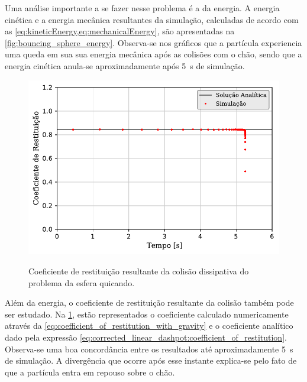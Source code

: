 Uma análise importante a se fazer nesse problema é a da energia. A energia cinética e a energia mecânica resultantes da simulação, calculadas de acordo com as \cref{eq:kineticEnergy,eq:mechanicalEnergy}, são apresentadas na \cref{fig:bouncing_sphere_energy}. Observa-se nos gráficos que a partícula experiencia uma queda em sua sua energia mecânica após as colisões com o chão, sendo que a energia cinética anula-se aproximadamente após \SI{5}{\second} de simulação.

\begin{figure}[h]
	\caption{Coeficiente de restituição resultante da colisão dissipativa do problema da esfera quicando.}
	\centering
		\includegraphics[scale=1]{images/bouncing_sphere/dissipative/coefficient_of_restitution.pdf}
	\label{fig:bouncing_sphere:dissipative:coefficient_of_restitution}
	\sourceMe
\end{figure}

Além da energia, o coeficiente de restituição resultante da colisão também pode ser estudado. Na \cref{fig:bouncing_sphere:dissipative:coefficient_of_restitution}, estão representados o coeficiente calculado numericamente através da \cref{eq:coefficient_of_restitution_with_gravity} e o coeficiente analítico dado pela expressão \eqref{eq:corrected_linear_dashpot:coefficient_of_restitution}. Observa-se uma boa concordância entre os resultados até aproximadamente \SI{5}{\second} de simulação. A divergência que ocorre após esse instante explica-se pelo fato de que a partícula entra em repouso sobre o chão.

